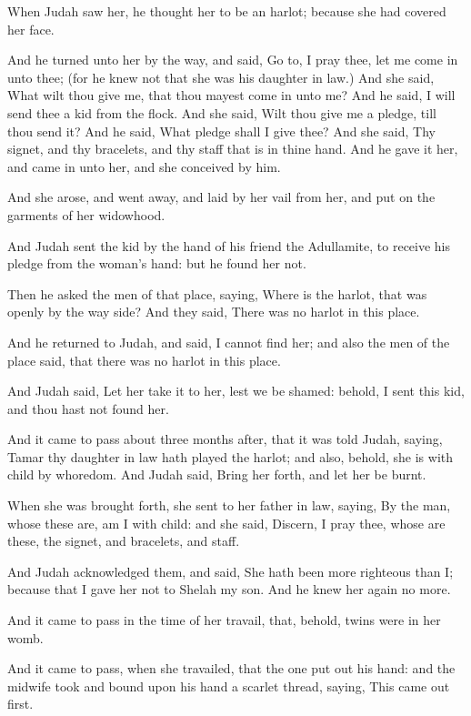 \verse When Judah saw her, he thought her to be an harlot; because she
had covered her face.

\verse And he turned unto her by the way, and said, Go to, I pray thee,
let me come in unto thee; (for he knew not that she was his daughter
in law.) And she said, What wilt thou give me, that thou mayest come
in unto me?  \verse And he said, I will send thee a kid from the flock.
And she said, Wilt thou give me a pledge, till thou send it?  \verse
And he said, What pledge shall I give thee? And she said, Thy signet,
and thy bracelets, and thy staff that is in thine hand. And he gave it
her, and came in unto her, and she conceived by him.

\verse And she arose, and went away, and laid by her vail from her, and
put on the garments of her widowhood.

\verse And Judah sent the kid by the hand of his friend the Adullamite,
to receive his pledge from the woman's hand: but he found her not.

\verse Then he asked the men of that place, saying, Where is the
harlot, that was openly by the way side? And they said, There was no
harlot in this place.

\verse And he returned to Judah, and said, I cannot find her; and also
the men of the place said, that there was no harlot in this place.

\verse And Judah said, Let her take it to her, lest we be shamed:
behold, I sent this kid, and thou hast not found her.

\verse And it came to pass about three months after, that it was told
Judah, saying, Tamar thy daughter in law hath played the harlot; and
also, behold, she is with child by whoredom. And Judah said, Bring her
forth, and let her be burnt.

\verse When she was brought forth, she sent to her father in law,
saying, By the man, whose these are, am I with child: and she said,
Discern, I pray thee, whose are these, the signet, and bracelets, and
staff.

\verse And Judah acknowledged them, and said, She hath been more
righteous than I; because that I gave her not to Shelah my son. And he
knew her again no more.

\verse And it came to pass in the time of her travail, that, behold,
twins were in her womb.

\verse And it came to pass, when she travailed, that the one put out
his hand: and the midwife took and bound upon his hand a scarlet
thread, saying, This came out first.

